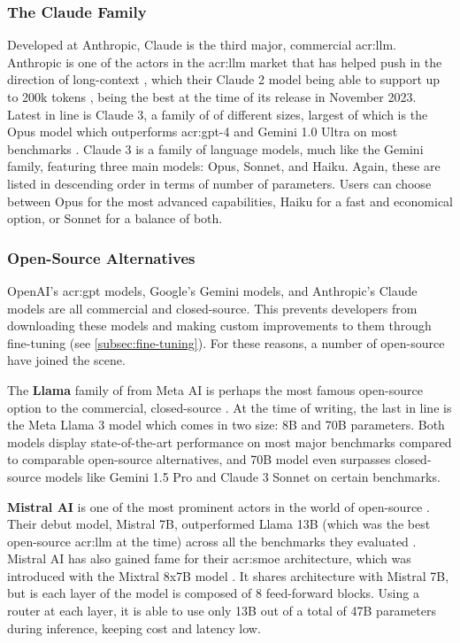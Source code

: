 \subsubsection{The Claude Family}
\label{subsubsec:claude}

Developed at Anthropic, Claude is the third major, commercial \acrshort{acr:llm}. Anthropic is one of the actors in the \acrshort{acr:llm} market that has helped push in the direction of long-context , which their Claude 2 model being able to support up to 200k tokens \citep[9]{anthropicModelCardEvaluations2023}, being the best at the time of its release in November 2023. Latest in line is Claude 3, a family of  of different sizes, largest of which is the Opus model which outperforms \acrshort{acr:gpt}-4 and Gemini 1.0 Ultra on most benchmarks \citep[6]{anthropicClaudeModelFamily2024}. Claude 3 is a family of language models, much like the Gemini family, featuring three main models: Opus, Sonnet, and Haiku. Again, these are listed in descending order in terms of number of parameters. Users can choose between Opus for the most advanced capabilities, Haiku for a fast and economical option, or Sonnet for a balance of both.

\subsubsection{Open-Source Alternatives}
\label{subsubsec:open-source-llms}

OpenAI's \acrshort{acr:gpt} models, Google's Gemini models, and Anthropic's Claude models are all commercial and closed-source. This prevents developers from downloading these models and making custom improvements to them through fine-tuning (see \autoref{subsec:fine-tuning}). For these reasons, a number of open-source  have joined the scene.

The \textbf{Llama} family of  from Meta AI is perhaps the most famous open-source option to the commercial, closed-source . At the time of writing, the last in line is the Meta Llama 3 model \citep{metaaiIntroducingMetaLlama2024} which comes in two size: 8B and 70B parameters. Both models display state-of-the-art performance on most major benchmarks compared to comparable open-source alternatives, and 70B model even surpasses closed-source models like Gemini 1.5 Pro and Claude 3 Sonnet on certain benchmarks.

\textbf{Mistral AI} is one of the most prominent actors in the world of open-source . Their debut model, Mistral 7B, outperformed Llama 13B (which was the best open-source \acrshort{acr:llm} at the time) across all the benchmarks they evaluated \citep{jiangMistral7B2023}. Mistral AI has also gained fame for their \gls{acr:smoe} architecture, which was introduced with the Mixtral 8x7B model \citep{jiangMixtralExperts2024}. It shares architecture with Mistral 7B, but is each layer of the model is composed of 8 feed-forward blocks. Using a router at each layer, it is able to use only 13B out of a total of 47B parameters during inference, keeping cost and latency low.

